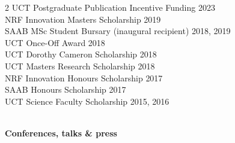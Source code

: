 \documentclass[10pt]{article}
\begin{document}
\begin{multicols}{2}
UCT Postgraduate Publication Incentive Funding     \hfill {\small       2023} \\
NRF Innovation Masters Scholarship                 \hfill {\small       2019} \\
SAAB MSc Student Bursary
  {\small (inaugural recipient)}                   \hfill {\small 2018, 2019} \\
UCT Once-Off Award                                 \hfill {\small       2018} \\
UCT Dorothy Cameron Scholarship                    \hfill {\small       2018} \\
UCT Masters Research Scholarship                   \hfill {\small       2018} \\
NRF Innovation Honours Scholarship                 \hfill {\small       2017} \\
SAAB Honours Scholarship                           \hfill {\small       2017} \\
UCT Science Faculty Scholarship                    \hfill {\small 2015, 2016} \\

\

\textbf{Conferences, talks \& press} \\ %


\end{multicols}
\end{document}
